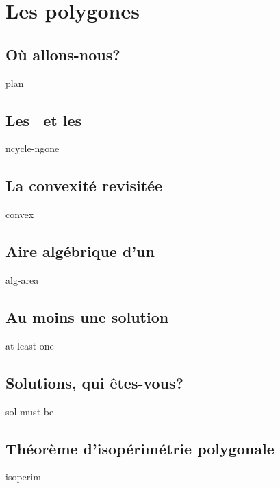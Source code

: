 \documentclass[12pt]{amsart}
\newcommand{\ncycle}{\xcycle{n}}
\newcommand{\ncycles}{\xcycles{n}}
\newcommand{\ngones}{\xgones{n}}
\begin{document}


\section{Les polygones}

\subsection{Où allons-nous?}
{plan}


\subsection{Les \ncycles\ et les \ngones}
{ncycle-ngone}



\subsection{La convexité revisitée}
{convex}


\subsection{Aire algébrique d'un \ncycle}
{alg-area}


\subsection{Au moins une solution}
{at-least-one}


\subsection{Solutions, qui êtes-vous?}
{sol-must-be}


\subsection{Théorème d'isopérimétrie polygonale}
{isoperim}
\end{document}
